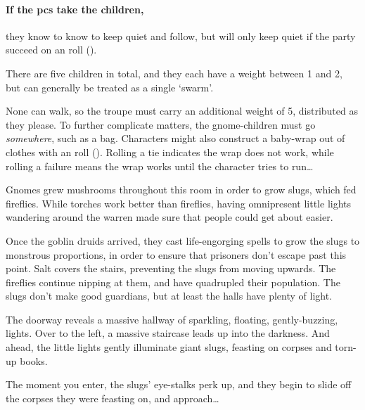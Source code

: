 \begin{multicols}{2}
\paragraph{If the \glspl{pc} take the children,}
they know to know to keep quiet and follow, but will only keep quiet if the party succeed on an  roll (\tn[10]).


There are five children in total, and they each have a \gls{weight} between 1 and 2, but can generally be treated as a single `swarm'.%

None can walk, so the troupe must carry an additional \gls{weight} of 5, distributed as they please.
To further complicate matters, the gnome-children must go \emph{somewhere}, such as a bag.
Characters might also construct a baby-wrap out of clothes with an  roll (\tn[10]).
Rolling a tie indicates the wrap does not work, while rolling a failure means the wrap works until the character tries to run\ldots


\begin{exampletext}
Gnomes grew mushrooms throughout this room in order to grow slugs, which fed fireflies.
While torches work better than fireflies, having omnipresent little lights wandering around the \gls{warren} made sure that people could get about easier.

Once the goblin druids arrived, they cast life-engorging spells to grow the slugs to monstrous proportions, in order to ensure that prisoners don't escape past this point.
Salt covers the stairs, preventing the slugs from moving upwards.
The fireflies continue nipping at them, and have quadrupled their population.
The slugs don't make good guardians, but at least the halls have plenty of light.
\end{exampletext}

\begin{boxtext}
  The doorway reveals a massive hallway of sparkling, floating, gently-buzzing, lights.
  Over to the left, a massive staircase leads up into the darkness.
  And ahead, the little lights gently illuminate giant slugs, feasting on corpses and torn-up books.

  The moment you enter, the slugs' eye-stalks perk up, and they begin to slide off the corpses they were feasting on, and approach\ldots
\end{boxtext}


\end{multicols}
